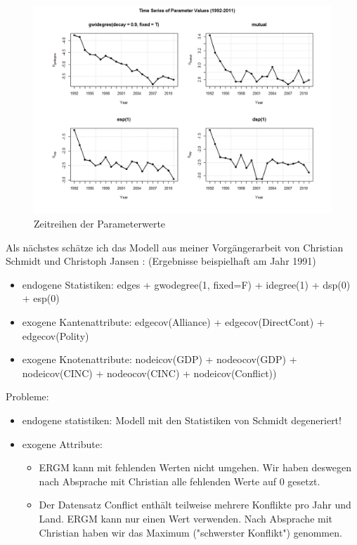 \documentclass[a4paper,ngerman,oneside,titlepage,bibliography=totoc,11pt]{scrreprt}
\begin{document}
\begin{figure}[ht]
	\centering
		\includegraphics[width=1.00\textwidth]{Grafiken/ts_ERGM_coef.png}
	\caption{Zeitreihen der Parameterwerte}
	\label{fig:ts_ERGM_coef}
\end{figure}

Als nächstes schätze ich das Modell aus meiner Vorgängerarbeit von Christian Schmidt und Christoph Jansen \cite{js14}: (Ergebnisse beispielhaft am Jahr 1991)
\begin{itemize}
  \item endogene Statistiken: edges + gwodegree(1, fixed=F) + idegree(1) + dsp(0) + esp(0)
	\item exogene Kantenattribute: edgecov(Alliance) + edgecov(DirectCont)  + edgecov(Polity)
  \item exogene Knotenattribute: nodeicov(GDP) + nodeocov(GDP) + nodeicov(CINC) + nodeocov(CINC) + nodeicov(Conflict))
\end{itemize}

Probleme:
\begin{itemize}
\item endogene statistiken: Modell mit den Statistiken von Schmidt degeneriert!
\item exogene Attribute: 
  \begin{itemize} 
  \item ERGM kann mit fehlenden Werten nicht umgehen. Wir haben deswegen nach Absprache mit Christian alle fehlenden Werte auf 0 gesetzt.
  \item Der Datensatz Conflict enthält teilweise mehrere Konflikte pro Jahr und Land. ERGM kann nur einen Wert verwenden. Nach Absprache mit Christian haben wir das Maximum ("schwerster Konflikt") genommen.
  \end{itemize}
\end{itemize}
\end{document}
